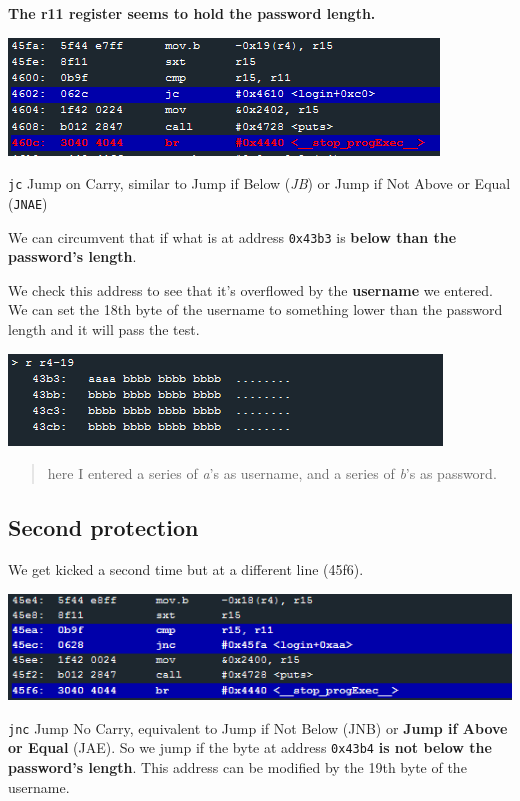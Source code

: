\textbf{The r11 register seems to hold the password length.}

\includegraphics{img/10_1.PNG}

\texttt{jc} Jump on Carry, similar to Jump if Below (\emph{JB}) or Jump
if Not Above or Equal (\texttt{JNAE})

We can circumvent that if what is at address \texttt{0x43b3} is
\textbf{below than the password's length}.

We check this address to see that it's overflowed by the
\textbf{username} we entered. We can set the 18th byte of the username
to something lower than the password length and it will pass the test.

\includegraphics{img/10_2.PNG}

\begin{quote}
here I entered a series of \emph{a}'s as username, and a series of
\emph{b}'s as password.
\end{quote}

\subsection{Second protection}\label{second-protection}

We get kicked a second time but at a different line (45f6).

\includegraphics{img/10_3.PNG}

\texttt{jnc} Jump No Carry, equivalent to Jump if Not Below (JNB) or
\textbf{Jump if Above or Equal} (JAE). So we jump if the byte at address
\texttt{0x43b4} \textbf{is not below the password's length}. This
address can be modified by the 19th byte of the username.

